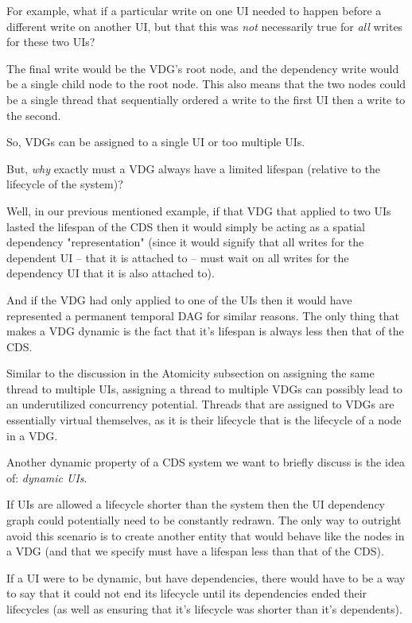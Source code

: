 For example, what if a particular write on one UI needed to happen before a different write on another UI, but that this was \textit{not} necessarily true for \textit{all} writes for these two UIs?

The final write would be the VDG's root node, and the dependency write would be a single child node to the root node. This also means that the two nodes could be a single thread that sequentially ordered a write to the first UI then a write to the second.

So, VDGs can be assigned to a single UI or too multiple UIs.

But, \textit{why} exactly must a VDG always have a limited lifespan (relative to the lifecycle of the system)?

Well, in our previous mentioned example, if that VDG that applied to two UIs lasted the lifespan of the CDS then it would simply be acting as a spatial dependency "representation" (since it would signify that all writes for the dependent UI -- that it is attached to -- must wait on all writes for the dependency UI that it is also attached to). 

And if the VDG had only applied to one of the UIs then it would have represented a permanent temporal DAG for similar reasons. The only thing that makes a VDG dynamic is the fact that it's lifespan is always less then that of the CDS.

Similar to the discussion in the Atomicity subsection on assigning the same thread to multiple UIs, assigning a thread to multiple VDGs can possibly lead to an underutilized concurrency potential. Threads that are assigned to VDGs are essentially virtual themselves, as it is their lifecycle that is the lifecycle of a node in a VDG.

Another dynamic property of a CDS system we want to briefly discuss is the idea of: \textit{dynamic UIs}.

If UIs are allowed a lifecycle shorter than the system then the UI dependency graph could potentially need to be constantly redrawn. The only way to outright avoid this scenario is to create another entity that would behave like the nodes in a VDG (and that we specify must have a lifespan less than that of the CDS).

If a UI were to be dynamic, but have dependencies, there would have to be a way to say that it could not end its lifecycle until its dependencies ended their lifecycles (as well as ensuring that it's lifecycle was shorter than it's dependents).

